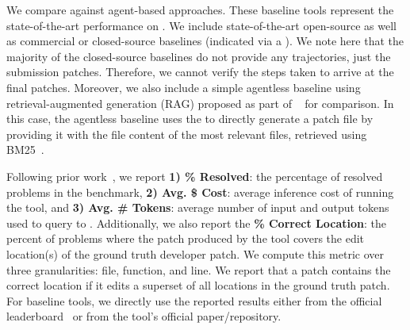 We compare \tech against \totalbaselines agent-based approaches. 
These baseline tools represent the state-of-the-art performance on \swebench{}. 
We include state-of-the-art open-source as well as commercial or closed-source baselines (indicated via a \lock{}). 
We note here that the majority of the closed-source baselines do not provide any trajectories, just the submission patches. Therefore, we cannot verify the steps taken to arrive at the final patches.
Moreover, we also include a simple agentless baseline using retrieval-augmented generation (RAG) proposed as part of \swebench~\cite{swebench} for comparison.
In this case, the agentless baseline uses the \llm to directly generate a patch file by providing it with the file content of the most relevant files, retrieved using BM25~\cite{robertson2009probabilistic}. 

Following prior work~\cite{autocoderover}, we report \textbf{1) \% Resolved}: the percentage of resolved problems in the benchmark, \textbf{2) Avg. \$ Cost}: average inference cost of running the tool, and \textbf{3) Avg. \# Tokens}: average number of input and output tokens used to query to \llm. 
Additionally, we also report the \textbf{\% Correct Location}: the percent of problems where the patch produced by the tool covers the edit location(s) of the ground truth developer patch.
We compute this metric over three granularities: file, function, and line. 
We report that a patch contains the correct location if it edits a superset of all locations in the ground truth patch.
For baseline tools, we directly use the reported results either from the official leaderboard~\cite{swebenchleaderboard} or from the tool's official paper/repository. 
